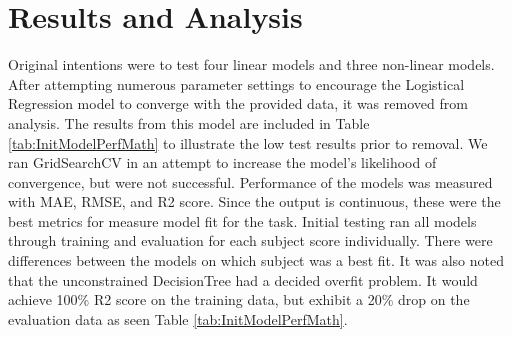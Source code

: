 \documentclass[man,floatsintext]{apa6} %
\begin{document}
\section{Results and Analysis}
Original intentions were to test four linear models and three non-linear models. After attempting numerous parameter settings to encourage the Logistical Regression model to converge with the provided data, it was removed from analysis. The results from this model are included in Table \ref{tab:InitModelPerfMath} to illustrate the low test results prior to removal. We ran GridSearchCV in an attempt to increase the model's likelihood of convergence, but were not successful.
Performance of the models was measured with MAE, RMSE, and R2 score. Since the output is continuous, these were the best metrics for measure model fit for the task.
Initial testing ran all models through training and evaluation for each subject score individually. There were differences between the models on which subject was a best fit.  It was also noted that the unconstrained DecisionTree had a decided overfit problem. It would achieve 100\% R2 score on the training data, but exhibit a 20\% drop on the evaluation data as seen Table \ref{tab:InitModelPerfMath}.
\end{document}
